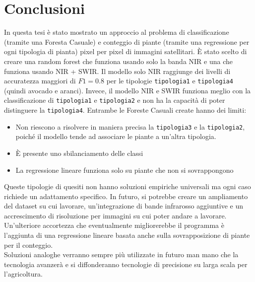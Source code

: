 \documentclass[a4paper, 12pt]{book}
\newcommand{\setupfancy}{
    \pagestyle{fancy}
    \fancyhf{}
    \renewcommand{\headrulewidth}{2pt}
    \fancyhead[EL]{\textbf{\textsf{\nouppercase\thepage}}}
    \fancyhead[ER]{\textbf{\textsf{\nouppercase\leftmark}}}
    \fancyhead[OR]{\textbf{\textsf{\nouppercase\thepage}}}
    \fancyhead[OL]{\textbf{\textsf{\nouppercase{\rightmark}}}}
}
\begin{document}
\clearpage
\thispagestyle{empty}
\chapter{Conclusioni}
\setupfancy
\thispagestyle{empty}
In questa tesi è stato mostrato un approccio al problema di classificazione (tramite una Foresta Casuale) e conteggio di piante (tramite una regressione per ogni tipologia di pianta) pixel per pixel di immagini satellitari. 
È stato scelto di creare una random forest che funziona usando solo la banda NIR e una che funziona usando NIR + SWIR. Il modello solo NIR raggiunge dei livelli di accuratezza maggiori 
di $F1=0.8$ per le tipologie \texttt{tipologia1} e \texttt{tipologia4} (quindi avocado e aranci). Invece, il modello NIR e SWIR funziona meglio con la classificazione di \texttt{tipologia1} e \texttt{tipologia2} e non ha la capacità di poter distinguere la \texttt{tipologia4}.
Entrambe le Foreste Casuali create hanno dei limiti:
\begin{itemize}
  \item Non riescono a risolvere in maniera precisa la \texttt{tipologia3} e la \texttt{tipologia2}, poiché il modello tende ad associare le piante a un'altra tipologia. 
  \item È presente uno sbilanciamento delle classi
  \item La regressione lineare funziona solo su piante che non si sovrappongono
\end{itemize}
Queste tipologie di quesiti non hanno soluzioni empiriche universali ma ogni caso richiede un adattamento specifico. 
In futuro, si potrebbe creare un ampliamento del dataset su cui lavorare, un'integrazione di bande infrarosso aggiuntive e un accrescimento di risoluzione per immagini su cui poter andare a lavorare.
Un'ulteriore accortezza che eventualmente migliorerebbe il programma è l'aggiunta di una regressione lineare basata anche sulla sovrapposizione di piante per il conteggio.\\
Soluzioni analoghe verranno sempre più utilizzate in futuro man mano che la tecnologia avanzerà e si diffonderanno
tecnologie di precisione su larga scala 
per l'agricoltura.

\printbibliography
\end{document}
